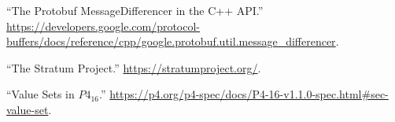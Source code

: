 \documentclass[11pt]{article}
\begin{document}
{{\begin{thebibliography}{35}
\mdbibitemlabel{{}[33]}\textquotedblleft{}The Protobuf MessageDifferencer in the C++ API.\textquotedblright{} \href{https://developers.google.com/protocol-buffers/docs/reference/cpp/google.protobuf.util.message_differencer}{{\ttfamily https://\hspace{0pt}developers.\hspace{0pt}google.\hspace{0pt}com/\hspace{0pt}protocol-\hspace{0pt}buffers/\hspace{0pt}docs/\hspace{0pt}reference/\hspace{0pt}cpp/\hspace{0pt}google.\hspace{0pt}protobuf.\hspace{0pt}util.\hspace{0pt}message\_\hspace{0pt}differencer}}.\label{protomessagedifferencer}%

\mdbibitemlabel{{}[34]}\textquotedblleft{}The Stratum Project.\textquotedblright{} \href{https://stratumproject.org/}{{\ttfamily https://\hspace{0pt}stratumproject.\hspace{0pt}org/\hspace{0pt}}}.\label{stratum}%

\mdbibitemlabel{{}[35]}\textquotedblleft{}Value Sets in $P4_{16}$.\textquotedblright{} \href{https://p4.org/p4-spec/docs/P4-16-v1.1.0-spec.html\%23sec-value-set}{{\ttfamily https://\hspace{0pt}p4.\hspace{0pt}org/\hspace{0pt}p4-\hspace{0pt}spec/\hspace{0pt}docs/\hspace{0pt}P4-\hspace{0pt}16-\hspace{0pt}v1.\hspace{0pt}1.\hspace{0pt}0-\hspace{0pt}spec.\hspace{0pt}html\#\hspace{0pt}sec-\hspace{0pt}value-\hspace{0pt}set}}.\label{p4valuesets}%
\par%
\end{thebibliography}}%
}%
\end{document}
